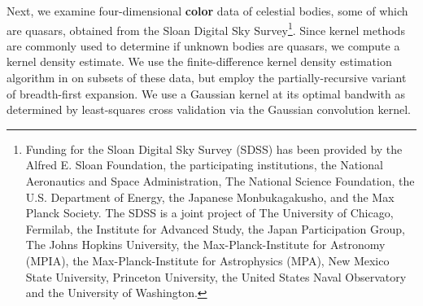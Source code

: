 \documentclass[twoside,leqno,twocolumn]{article}
\newcommand{\defterm}[1]{{\bf #1}}
\begin{document}
Next, we examine four-dimensional \defterm{color} data of celestial bodies, some of which are quasars, obtained from the Sloan Digital Sky Survey\footnote{
  Funding for the Sloan Digital Sky Survey (SDSS) has been provided by the Alfred E. Sloan Foundation, the participating institutions, the National Aeronautics and Space Administration, The National Science Foundation, the U.S. Department of Energy, the Japanese Monbukagakusho, and the Max Planck Society. The SDSS is a joint project of The University of Chicago, Fermilab, the Institute for Advanced Study, the Japan Participation Group, The Johns Hopkins University, the Max-Planck-Institute for Astronomy (MPIA), the Max-Planck-Institute for Astrophysics (MPA), New Mexico State University, Princeton University, the United States Naval Observatory and the University of Washington.
}.
Since kernel methods are commonly used to determine if unknown bodies are quasars, we compute a kernel density estimate.
We use the finite-difference kernel density estimation algorithm in \cite{gray_kde} on subsets of these data, but employ the partially-recursive variant of breadth-first expansion.
We use a Gaussian kernel at its optimal bandwith as determined by least-squares cross validation via the Gaussian convolution kernel.
\end{document}
